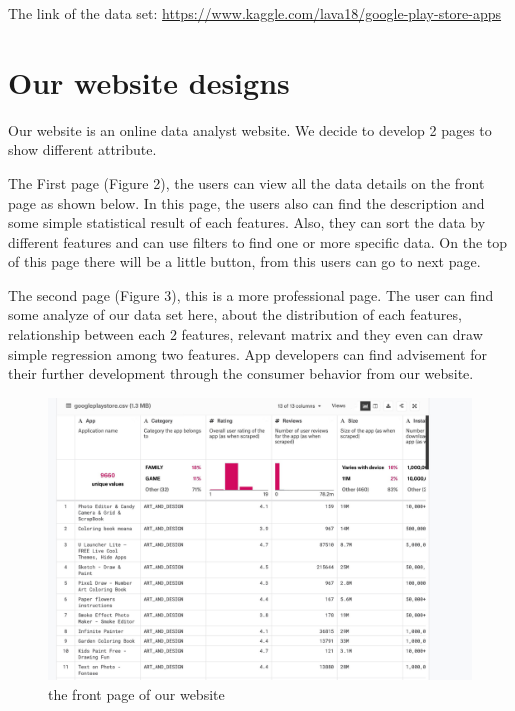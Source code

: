 \documentclass[12pt]{article}
\begin{document}
The link of the data set: \href{https://www.kaggle.com/lava18/google-play-store-apps}{https://www.kaggle.com/lava18/google-play-store-apps} 

\section{Our website designs}
Our website is an online data analyst website. We decide to develop 2 pages to show different attribute.

The First page (Figure 2), the users can view all the data details on the front page as shown below. In this page, the users also can find the description and some simple statistical result of each features. Also, they can sort the data by different features and can use filters to find one or more specific data. On the top of this page there will be a little button, from this users can go to next page.

The second page (Figure 3), this is a more professional page. The user can find some analyze of our data set here, about the distribution of each features, relationship between each 2 features, relevant matrix and they even can draw simple regression among two features. App developers can find advisement for their further development through the consumer behavior from our website.

\begin{figure}[H]
\centering
\includegraphics[scale=0.15]{Images/Picture2.png} 
\caption{the front page of our website}
\label{picture2}
\end{figure}
\end{document}
